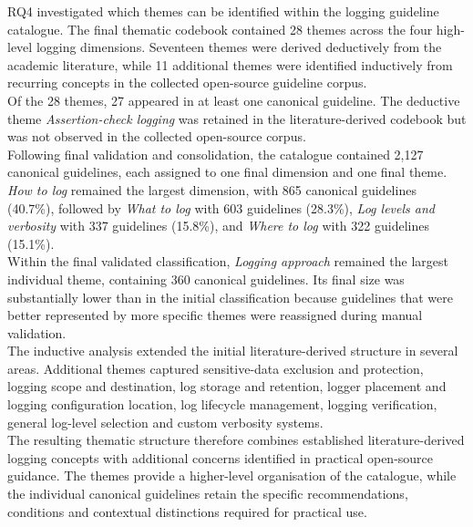 RQ4 investigated which themes can be identified within the logging guideline
catalogue. The final thematic codebook contained 28 themes across the four
high-level logging dimensions. Seventeen themes were derived deductively from the
academic literature, while 11 additional themes were identified inductively from
recurring concepts in the collected open-source guideline corpus.
\\
Of the 28 themes, 27 appeared in at least one canonical guideline.
The deductive theme \textit{Assertion-check logging} was retained in the
literature-derived codebook but was not observed in the collected open-source
corpus.
\\
Following final validation and consolidation, the catalogue contained 2,127
canonical guidelines, each assigned to one final dimension and one final theme.
\textit{How to log} remained the largest dimension, with 865 canonical guidelines
(40.7\%), followed by \textit{What to log} with 603 guidelines (28.3\%),
\textit{Log levels and verbosity} with 337 guidelines (15.8\%), and
\textit{Where to log} with 322 guidelines (15.1\%).
\\
Within the final validated classification, \textit{Logging approach} remained the
largest individual theme, containing 360 canonical guidelines. Its final size was
substantially lower than in the initial classification because guidelines that were
better represented by more specific themes were reassigned during manual validation.
\\
The inductive analysis extended the initial literature-derived structure in several
areas. Additional themes captured sensitive-data exclusion and protection, logging
scope and destination, log storage and retention, logger placement and logging
configuration location, log lifecycle management, logging verification, general
log-level selection and custom verbosity systems.
\\
The resulting thematic structure therefore combines established literature-derived
logging concepts with additional concerns identified in practical open-source
guidance. The themes provide a higher-level organisation of the catalogue, while
the individual canonical guidelines retain the specific recommendations, conditions
and contextual distinctions required for practical use.